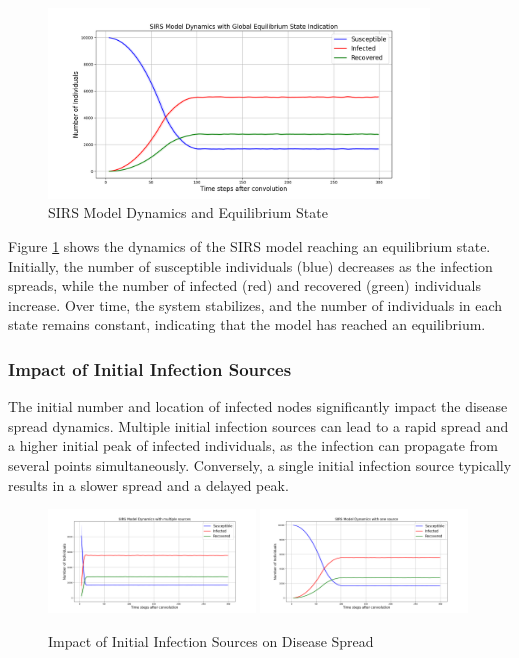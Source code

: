 \begin{figure}[H]
    \centering
    \includegraphics[width=0.9\textwidth]{img/equilibrium_state.png}
    \caption{SIRS Model Dynamics and Equilibrium State}
    \label{fig:equilibrium_state}
\end{figure}

\noindent
Figure \ref{fig:equilibrium_state} shows the dynamics of the SIRS model reaching an equilibrium state. Initially, the number of susceptible individuals (blue) decreases as the infection spreads, while the number of infected (red) and recovered (green) individuals increase. Over time, the system stabilizes, and the number of individuals in each state remains constant, indicating that the model has reached an equilibrium.

\subsubsection{Impact of Initial Infection Sources}
The initial number and location of infected nodes significantly impact the disease spread dynamics. Multiple initial infection sources can lead to a rapid spread and a higher initial peak of infected individuals, as the infection can propagate from several points simultaneously. Conversely, a single initial infection source typically results in a slower spread and a delayed peak.

\begin{figure}[H]
    \centering
    \includegraphics[width=0.49\textwidth]{img/multiple_sources.png}
    \includegraphics[width=0.49\textwidth]{img/one_source.png}
    \caption{Impact of Initial Infection Sources on Disease Spread}
    \label{fig:infection_sources_impact}
\end{figure}

